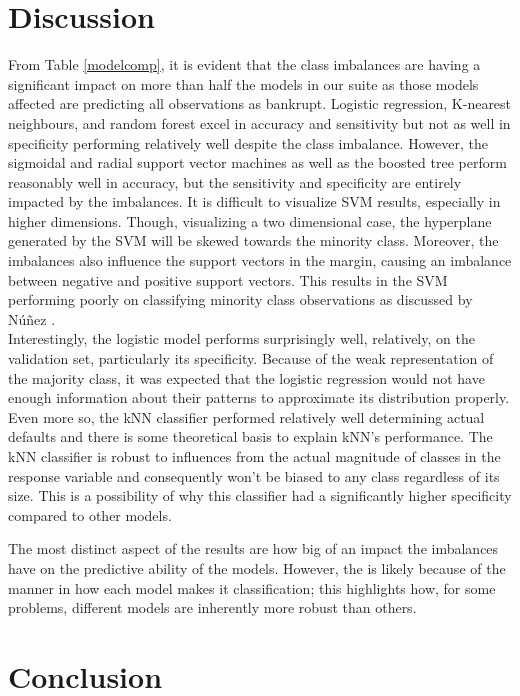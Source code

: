 \documentclass[12pt]{report}
\begin{document}
\section{Discussion}

From Table \ref{modelcomp}, it is evident that the class imbalances are having a significant impact on more than half the models in our suite as those models affected are predicting all observations as bankrupt. Logistic regression, K-nearest neighbours, and random forest excel in accuracy and sensitivity but not as well in specificity performing relatively well despite the class imbalance. However, the sigmoidal and radial support vector machines as well as the boosted tree perform reasonably well in accuracy, but the sensitivity and specificity are entirely impacted by the imbalances. It is difficult to visualize SVM results, especially in higher dimensions. Though, visualizing a two dimensional case, the hyperplane generated by the SVM will be skewed towards the minority class. Moreover, the imbalances also influence the support vectors in the margin, causing an imbalance between negative and positive support vectors. This results in the SVM performing poorly on classifying minority class observations as discussed by Núñez \cite{SVM}. \\
\indent Interestingly, the logistic model performs surprisingly well, relatively, on the validation set, particularly its specificity. Because of the weak representation of the majority class, it was expected that the logistic regression would not have enough information about their patterns to approximate its distribution properly. Even more so, the kNN classifier performed relatively well determining actual defaults and there is some theoretical basis to explain kNN's performance. The kNN classifier is robust to influences from the actual magnitude of classes in the response variable and consequently won't be biased to any class regardless of its size. This is a possibility of why this classifier had a significantly higher specificity compared to other models.  

The most distinct aspect of the results are how big of an impact the imbalances have on the predictive ability of the models. However, the is likely because of the manner in how each model makes it classification; this highlights how, for some problems, different models are inherently more robust than others. 

\section{Conclusion}
\end{document}

